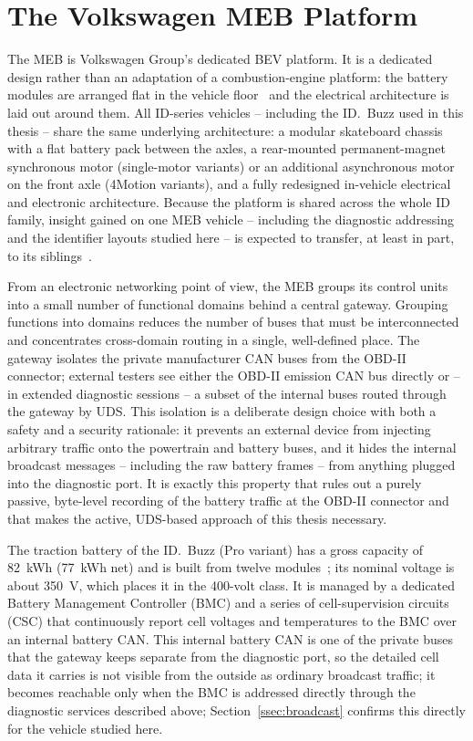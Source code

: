 \documentclass[11pt,a4paper,oneside,parskip=half]{scrreprt}
\begin{document}
\section{The Volkswagen MEB Platform}
\label{sec:meb}
The MEB is Volkswagen Group's dedicated BEV platform. It is a dedicated design rather than an adaptation of a combustion-engine platform: the battery modules are arranged flat in the vehicle floor~\cite{vw_idbuzz_drive} and the electrical architecture is laid out around them. All ID-series vehicles -- including the ID.~Buzz used in this thesis -- share the same underlying architecture: a modular skateboard chassis with a flat battery pack between the axles, a rear-mounted permanent-magnet synchronous motor (single-motor variants) or an additional asynchronous motor on the front axle (4Motion variants), and a fully redesigned in-vehicle electrical and electronic architecture. Because the platform is shared across the whole ID family, insight gained on one MEB vehicle -- including the diagnostic addressing and the identifier layouts studied here -- is expected to transfer, at least in part, to its siblings~\cite{vw_meb_battery}.

From an electronic networking point of view, the MEB groups its control units into a small number of functional domains behind a central gateway. Grouping functions into domains reduces the number of buses that must be interconnected and concentrates cross-domain routing in a single, well-defined place. The gateway isolates the private manufacturer CAN buses from the OBD-II connector; external testers see either the OBD-II emission CAN bus directly or -- in extended diagnostic sessions -- a subset of the internal buses routed through the gateway by UDS. This isolation is a deliberate design choice with both a safety and a security rationale: it prevents an external device from injecting arbitrary traffic onto the powertrain and battery buses, and it hides the internal broadcast messages -- including the raw battery frames -- from anything plugged into the diagnostic port. It is exactly this property that rules out a purely passive, byte-level recording of the battery traffic at the OBD-II connector and that makes the active, UDS-based approach of this thesis necessary.

The traction battery of the ID.~Buzz (Pro variant) has a gross capacity of 82~kWh (77~kWh net) and is built from twelve modules~\cite{vw_idbuzz_drive}; its nominal voltage is about 350~V, which places it in the 400-volt class. It is managed by a dedicated Battery Management Controller (BMC) and a series of cell-supervision circuits (CSC) that continuously report cell voltages and temperatures to the BMC over an internal battery CAN. This internal battery CAN is one of the private buses that the gateway keeps separate from the diagnostic port, so the detailed cell data it carries is not visible from the outside as ordinary broadcast traffic; it becomes reachable only when the BMC is addressed directly through the diagnostic services described above; Section~\ref{ssec:broadcast} confirms this directly for the vehicle studied here.
\end{document}
